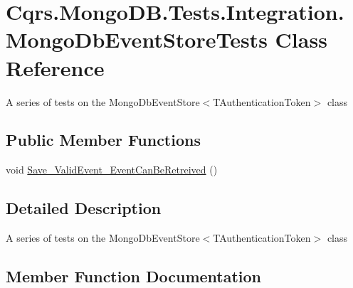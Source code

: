 \hypertarget{classCqrs_1_1MongoDB_1_1Tests_1_1Integration_1_1MongoDbEventStoreTests}{}\section{Cqrs.\+Mongo\+D\+B.\+Tests.\+Integration.\+Mongo\+Db\+Event\+Store\+Tests Class Reference}
\label{classCqrs_1_1MongoDB_1_1Tests_1_1Integration_1_1MongoDbEventStoreTests}


A series of tests on the Mongo\+Db\+Event\+Store$<$\+T\+Authentication\+Token$>$ class  


\subsection*{Public Member Functions}
\begin{DoxyCompactItemize}
\item 
void \hyperlink{classCqrs_1_1MongoDB_1_1Tests_1_1Integration_1_1MongoDbEventStoreTests_a399ae37cf9f492b3e55d1480f97b1520_a399ae37cf9f492b3e55d1480f97b1520}{Save\+\_\+\+Valid\+Event\+\_\+\+Event\+Can\+Be\+Retreived} ()
\end{DoxyCompactItemize}


\subsection{Detailed Description}
A series of tests on the Mongo\+Db\+Event\+Store$<$\+T\+Authentication\+Token$>$ class 



\subsection{Member Function Documentation}
\mbox{\label{classCqrs_1_1MongoDB_1_1Tests_1_1Integration_1_1MongoDbEventStoreTests_a399ae37cf9f492b3e55d1480f97b1520_a399ae37cf9f492b3e55d1480f97b1520}} 
